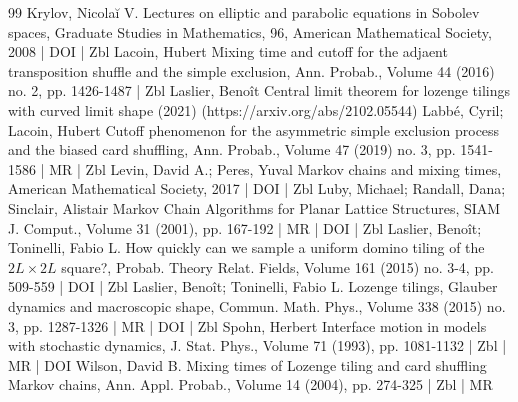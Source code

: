\documentclass[10pt]{amsart}
\theoremstyle{definition}\newtheorem{defi}[theo]{Definition}\newtheorem{rema}[theo]{Remark}\newtheorem{exam}[theo]{Example}\newtheorem{exem}[theo]{Example}\newtheorem{nota}[theo]{Notation}
\begin{document}
\begin{thebibliography}{99}
Krylov, Nicolaĭ V. Lectures on elliptic and parabolic equations in Sobolev spaces, Graduate Studies in Mathematics, 96, American Mathematical Society, 2008 | DOI | Zbl
Lacoin, Hubert Mixing time and cutoff for the adjaent transposition shuffle and the simple exclusion, Ann. Probab., Volume 44 (2016) no. 2, pp. 1426-1487 | Zbl
Laslier, Benoît Central limit theorem for lozenge tilings with curved limit shape (2021) (https://arxiv.org/abs/2102.05544)
Labbé, Cyril; Lacoin, Hubert Cutoff phenomenon for the asymmetric simple exclusion process and the biased card shuffling, Ann. Probab., Volume 47 (2019) no. 3, pp. 1541-1586 | MR | Zbl
Levin, David A.; Peres, Yuval Markov chains and mixing times, American Mathematical Society, 2017 | DOI | Zbl
Luby, Michael; Randall, Dana; Sinclair, Alistair Markov Chain Algorithms for Planar Lattice Structures, SIAM J. Comput., Volume 31 (2001), pp. 167-192 | MR | DOI | Zbl
Laslier, Benoît; Toninelli, Fabio L. How quickly can we sample a uniform domino tiling of the $2{L} \times 2{L} $ square?, Probab. Theory Relat. Fields, Volume 161 (2015) no. 3-4, pp. 509-559 | DOI | Zbl
Laslier, Benoît; Toninelli, Fabio L. Lozenge tilings, Glauber dynamics and macroscopic shape, Commun. Math. Phys., Volume 338 (2015) no. 3, pp. 1287-1326 | MR | DOI | Zbl
Spohn, Herbert Interface motion in models with stochastic dynamics, J. Stat. Phys., Volume 71 (1993), pp. 1081-1132 | Zbl | MR | DOI
Wilson, David B. Mixing times of Lozenge tiling and card shuffling Markov chains, Ann. Appl. Probab., Volume 14 (2004), pp. 274-325 | Zbl | MR
\end{thebibliography}
\end{document}

